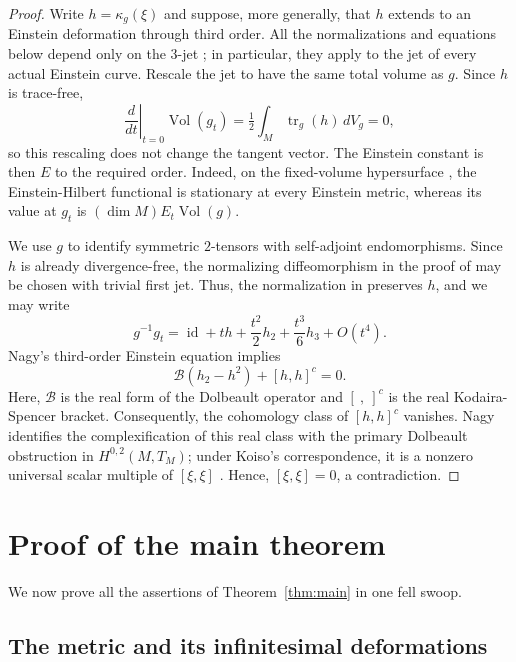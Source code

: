 \documentclass[11pt]{amsart}
\numberwithin{equation}{section}
\theoremstyle{plain}
\theoremstyle{definition}
\newcommand{\half}{\tfrac12}
\DeclareMathOperator{\Vol}{Vol}
\begin{document}
\begin{proof}
Write $h=\kappa_g(\xi)$ and suppose, more generally, that $h$ extends to an Einstein deformation through third order. All the normalizations and equations below depend only on the $3$-jet \cite[Thm.~5.12]{NagyThird}; in particular, they apply to the jet of every actual Einstein curve. Rescale the jet to have the same total volume as $g$. Since $h$ is trace-free,
$$\left.\frac{d}{dt}\right|_{t=0}\Vol(g_t)
=\half\int_M\operatorname{tr}_g(h)\,dV_g=0,$$
so this rescaling does not change the tangent vector. The Einstein constant is then $E$ to the required order. Indeed, on the fixed-volume hypersurface , the Einstein-Hilbert functional is stationary at every Einstein metric, whereas its value at $g_t$ is $(\dim M)E_t\Vol(g)$.

We use $g$ to identify symmetric $2$-tensors with self-adjoint endomorphisms. Since $h$ is already divergence-free, the normalizing diffeomorphism in the proof of \cite[Prop.~3.2]{NagyThird} may be chosen with trivial first jet. Thus, the normalization in \cite[Thm.~1.2(i)]{NagyThird} preserves $h$, and we may write
$$g^{-1}g_t=\operatorname{id}+th+\frac{t^2}{2}h_2+\frac{t^3}{6}h_3+O(t^4).$$
Nagy's third-order Einstein equation \cite[Thm.~1.2(ii)(b)]{NagyThird} implies
\begin{equation}\label{eq:nagy}
\mathcal B(h_2-h^2)+[h,h]^c=0.
\end{equation}
Here, $\mathcal B$ is the real form of the Dolbeault operator and $[\ ,\ ]^c$ is the real Kodaira-Spencer bracket. Consequently, the cohomology class of $[h,h]^c$ vanishes. Nagy identifies the complexification of this real class with the primary Dolbeault obstruction in $H^{0,2}(M,T_M)$; under Koiso's correspondence, it is a nonzero universal scalar multiple of $[\xi,\xi]$ \cite[\S2.2 and the discussion following Thm.~1.2]{NagyThird}. Hence, $[\xi,\xi]=0$, a contradiction.
\end{proof}

\section{Proof of the main theorem}

We now prove all the assertions of Theorem~\ref{thm:main} in one fell swoop.

\subsection{The metric and its infinitesimal deformations}
\end{document}
